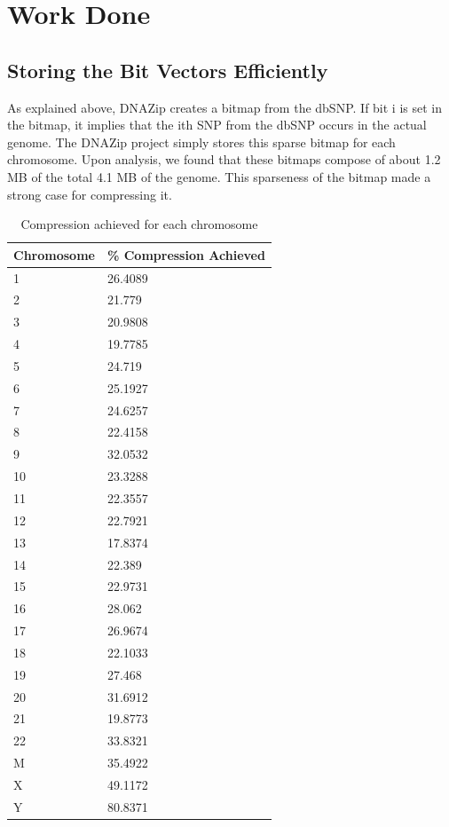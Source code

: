 \documentclass{article}
\begin{document}
\section {Work Done}

\subsection {Storing the Bit Vectors Efficiently}
As explained above, DNAZip creates a bitmap from the dbSNP. If bit i is set in the bitmap, it implies that the ith SNP from the dbSNP occurs in the actual genome. The DNAZip project simply stores this sparse bitmap for each chromosome. Upon analysis, we found that these bitmaps compose of about 1.2 MB of the total 4.1 MB of the genome. This sparseness of the bitmap made a strong case for compressing it.
\begin{center}
\begin{table}
	\begin{tabular}{|p{1in}|p{1in}|}

	\hline
	Chromosome	&		\% Compression Achieved \\
	\hline
1 & 26.4089\\
	\hline
2 & 21.779\\
	\hline
3 & 20.9808\\
	\hline
4 & 19.7785\\
	\hline
5 & 24.719\\
	\hline
6 & 25.1927\\
	\hline
7 & 24.6257\\
	\hline
8 & 22.4158\\
	\hline
9 & 32.0532\\
	\hline
10 & 23.3288\\
	\hline
11 & 22.3557\\
	\hline
12 & 22.7921\\
	\hline
13 & 17.8374\\
	\hline
14 & 22.389\\
	\hline
15 & 22.9731\\
	\hline
16 & 28.062\\
	\hline
17 & 26.9674\\
	\hline
18 & 22.1033\\
	\hline
19 & 27.468\\
	\hline
20 & 31.6912\\
	\hline
21 & 19.8773\\
	\hline
22 & 33.8321\\
	\hline
M & 35.4922\\
	\hline
X & 49.1172\\
	\hline
Y & 80.8371\\

	\hline
	\end{tabular}
	\caption{Compression achieved for each chromosome}
\end{table}
\end{center}
\end{document}
